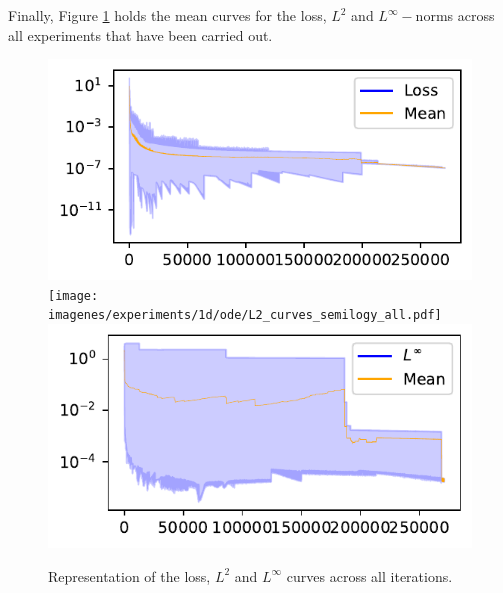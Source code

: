 \documentclass[12pt]{report} %
\begin{document}
Finally, 
Figure \ref{fig:ode-1d-results-all} holds the mean curves for the loss, $L^2$ and $L^\infty-$norms across all experiments that have been carried out.

\begin{figure}[h]
  \includegraphics[width=.7\textwidth]{imagenes/experiments/1d/ode/Loss_curves_semilogy_all.pdf}
  \texttt{[image: imagenes/experiments/1d/ode/L2\_curves\_semilogy\_all.pdf]}
  \includegraphics[width=.7\textwidth]{imagenes/experiments/1d/ode/Linf_curves_semilogy_all.pdf}
  \caption{Representation of the loss, $L^2$ and $L^\infty$ curves across all iterations.}
  \label{fig:ode-1d-results-all}
\end{figure}
\end{document}
